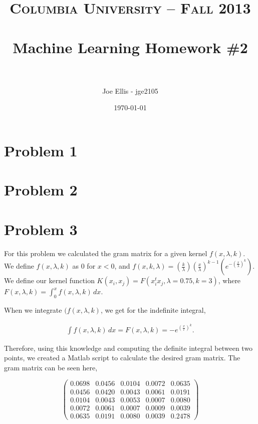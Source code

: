 \documentclass[paper=a4, fontsize=11pt]{scrartcl} %
\title{	
\normalfont \normalsize 
\textsc{Columbia University -- Fall 2013} \\ [25pt] %
\horrule{0.5pt} \\[0.4cm] %
\huge Machine Learning Homework \#2\\ %
\horrule{2pt} \\[0.5cm] %
}
\author{Joe Ellis - jge2105} %
\date{\normalsize\today} %
\begin{document}
\maketitle %


\section{Problem 1}


\section{Problem 2}


\section{Problem 3}

For this problem we calculated the gram matrix for a given kernel $f(x,\lambda,k)$.
We define $f(x,\lambda,k)$ as $0$ for $x < 0$, and $f(x,k,\lambda)=(\frac{k}{\lambda})(\frac{x}{\lambda})^{k-1}(e^{-(\frac{x}{\lambda})^k})$.
We define our kernel function $K(x_i,x_j) = F(x_i^tx_j,\lambda=0.75,k=3)$, where $F(x,\lambda,k) =\int^x_0 f(x,\lambda,k)\,dx$. 

When we integrate $(f(x,\lambda,k)$, we get for the indefinite integral, 

\begin{align}
\int f(x,\lambda,k) \,dx = F(x,\lambda,k) = -e^{(\frac{x}{l})^k}.
\end{align}

Therefore, using this knowledge and computing the definite integral between two points, we created a Matlab script to calculate the desired gram matrix.
The gram matrix can be seen here, 

\[ \left( \begin{array}{ccccc}
0.0698 & 0.0456 & 0.0104 & 0.0072 & 0.0635 \\
0.0456 & 0.0420 & 0.0043 & 0.0061 & 0.0191 \\
0.0104 & 0.0043 & 0.0053 & 0.0007 & 0.0080 \\
0.0072 & 0.0061 & 0.0007 & 0.0009 & 0.0039 \\
0.0635 & 0.0191 & 0.0080 & 0.0039 & 0.2478\end{array} \right)\] 
\end{document}
